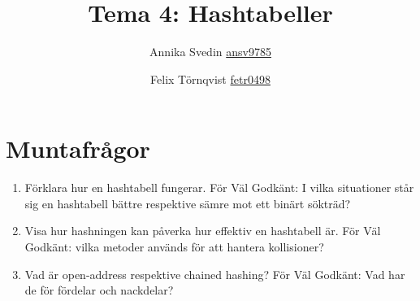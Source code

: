 \documentclass[a5paper,10pt,oneside]{article}
\title{Tema 4: Hashtabeller}
\author{Annika Svedin \url{ansv9785} \and Felix Törnqvist \url{fetr0498}}
\begin{document}
\maketitle

\section*{Muntafrågor}

\begin{enumerate}
	\item Förklara hur en hashtabell fungerar. För Väl Godkänt: I vilka situationer står sig en hashtabell bättre respektive sämre mot ett binärt sökträd?
	
	\item Visa hur hashningen kan påverka hur effektiv en hashtabell är. För Väl Godkänt: vilka metoder används för att hantera kollisioner?
	
	\item Vad är open-address respektive chained hashing? För Väl Godkänt: Vad har de för fördelar och nackdelar?
\end{enumerate}
\end{document}
